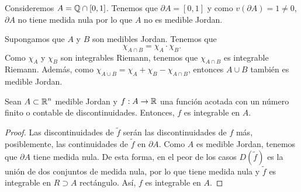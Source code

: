 \begin{eg}
	Consideremos $\displaystyle A = \mathbb{Q} \cap \left[0,1\right]  $. Tenemos que $\displaystyle \partial A = \left[0,1\right]  $ y como $\displaystyle v\left(\partial A\right) = 1 \neq 0$, $\displaystyle \partial A $ no tiene medida nula por lo que $\displaystyle A $ no es medible Jordan.
\end{eg}
\begin{observation}
Supongamos que $\displaystyle A $ y $\displaystyle B $ son medibles Jordan. Tenemos que 
\[\chi_{A \cap B} = \chi_{A} \cdot \chi_{B} .\]
Como $\displaystyle \chi_{A} $ y $\displaystyle \chi_{B} $ son integrables Riemann, tenemos que $\displaystyle \chi_{A \cap B} $ es integrable Riemann. Además, como $\displaystyle \chi_{A \cup B} = \chi_{A} + \chi_{B} - \chi_{A \cap B} $, entonces $\displaystyle A \cup B $ también es medible Jordan. 
\end{observation}
\begin{colorary}
Sean $\displaystyle A \subset \mathbb{R}^{n} $ medible Jordan y $\displaystyle f : A \to \mathbb{R} $ una función acotada con un número finito o contable de discontinuidades. Entonces, $\displaystyle f $ es integrable en $\displaystyle A $. 
\end{colorary}
\begin{proof}
	Las discontinuidades de $\displaystyle \tilde{f} $ serán las discontinuidades de $\displaystyle f $ más, posiblemente, las continuidades de $\displaystyle \tilde{f} $ en $\displaystyle \partial A $. Como $\displaystyle A $ es medible Jordan, tenemos que $\displaystyle \partial A $ tiene medida nula. De esta forma, en el peor de los casos $\displaystyle D\left(\tilde{f}\right) $ es la unión de dos conjuntos de medida nula, por lo que tiene medida nula y $\displaystyle \tilde{f} $ es integrable en $\displaystyle R \supset A $ rectángulo. Así, $\displaystyle f $ es integrable en $\displaystyle A $. 
\end{proof}

